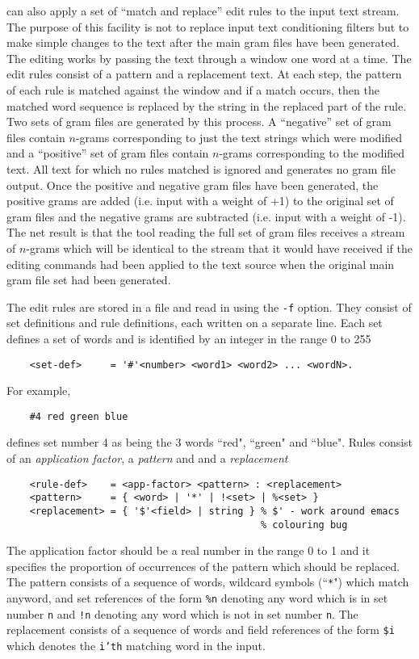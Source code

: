  can also apply a set of ``match and replace'' edit 
rules to the input text stream.  The purpose of this facility is not
to replace input text conditioning filters but to make simple changes
to the text after the main gram files have been generated.  The
editing works by passing the text through a window one word at a time.
The edit rules consist of a pattern and a replacement text. At each
step, the pattern of each rule is matched against the window and if a
match occurs, then the matched word sequence is replaced by the string
in the replaced part of the rule.  Two sets of gram files are
generated by this process.  A ``negative'' set of gram files contain
$n$-grams corresponding to just the text strings which were modified and
a ``positive'' set of gram files contain $n$-grams corresponding to the
modified text.  All text for which no rules matched is ignored and
generates no gram file output.  Once the positive and negative gram
files have been generated, the positive grams are added (i.e. input
with a weight of +1) to the original set of gram files and the
negative grams are subtracted (i.e. input with a weight of -1).  The
net result is that the tool reading the full set of gram files
receives a stream of $n$-grams which will be identical to the stream that
it would have received if the editing commands had been applied to the
text source when the original main gram file set had been generated.

The edit rules are stored in a file and read in using the \texttt{-f}
option.  They consist of set definitions and rule definitions, each
written on a separate line. Each set defines a set of words and is
identified by an integer in the range 0 to 255
\begin{verbatim}
    <set-def>     = '#'<number> <word1> <word2> ... <wordN>.
\end{verbatim}
For example, 
\begin{verbatim}
    #4 red green blue 
\end{verbatim}
defines set number 4 as being the 3 words ``red", ``green" and ``blue".  Rules
consist of an \textit{application factor}, a \textit{pattern} and and a
\textit{replacement}
\begin{verbatim}
    <rule-def>    = <app-factor> <pattern> : <replacement>
    <pattern>     = { <word> | '*' | !<set> | %<set> }
    <replacement> = { '$'<field> | string } % $' - work around emacs
                                            % colouring bug
\end{verbatim}
The application factor should be a real number in the range 0 to 1 and
it specifies the proportion of occurrences of the pattern which should
be replaced.  The pattern consists of a sequence of words, wildcard
symbols (``\texttt{*}") which match anyword, and set references of the
form \texttt{\%n} denoting any word which is in set number \texttt{n}
and \texttt{!n} denoting any word which is not in set number
\texttt{n}.  The replacement consists of a sequence of words and field
references of the form \texttt{\$i} which denotes the \texttt{i'th}
matching word in the input.

